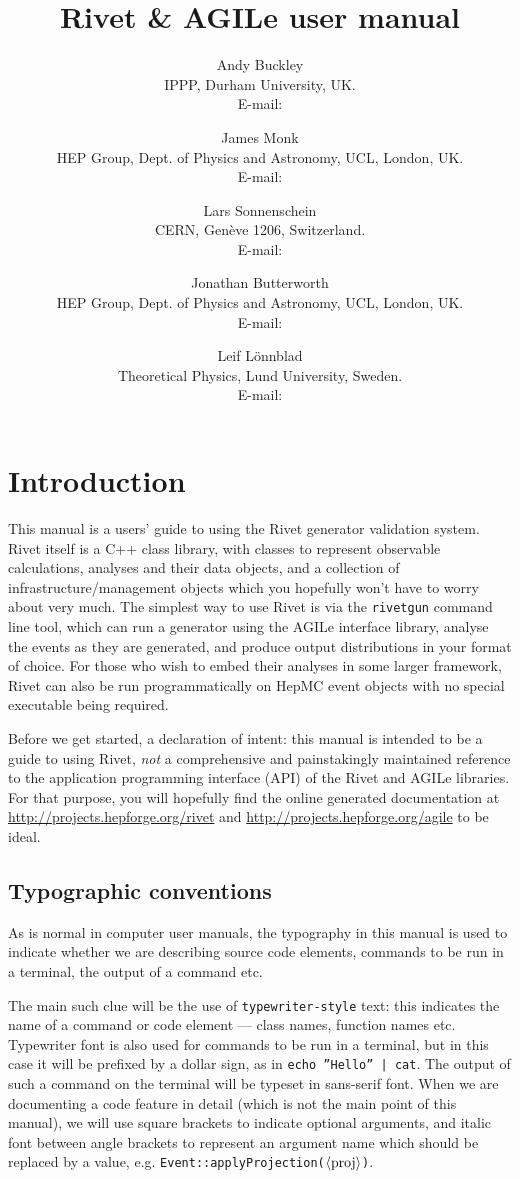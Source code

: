 \documentclass{JHEP3}
\title{Rivet \& AGILe user manual}
\author{Andy Buckley\\ IPPP, Durham University, UK.\\ E-mail: \email{andy.buckley@durham.ac.uk}}
\author{James Monk\\ HEP Group, Dept. of Physics and Astronomy, UCL, London, UK.\\ E-mail: \email{jmonk@hep.ucl.ac.uk}}
\author{Lars Sonnenschein\\ CERN, Gen\`eve 1206, Switzerland.\\ E-mail: \email{sonne@cern.ch}}
\author{Jonathan Butterworth\\ HEP Group, Dept. of Physics and Astronomy, UCL, London, UK.\\ E-mail: \email{J.Butterworth@ucl.ac.uk}}
\author{Leif L\"onnblad\\ Theoretical Physics, Lund University, Sweden.\\ E-mail: \email{lonnblad@thep.lu.se}}
\newcommand{\kbd}[1]{\texttt{#1}\xspace}
\newcommand{\inp}[1]{\textsf{\textdollar}\hspace{1mm}\texttt{#1}\xspace}
\newcommand{\outp}[1]{\textsf{#1}\xspace}
\newcommand{\code}[1]{\texttt{#1}\xspace}
\newcommand{\val}[1]{\textit{\ensuremath{\langle\text{\textrm{#1}\/}\rangle}}\xspace}
\begin{document}
 


\section{Introduction}
This manual is a users' guide to using the Rivet generator validation
system. Rivet itself is a C++ class library, with classes to represent
observable calculations, analyses and their data objects, and a collection of
infrastructure/management objects which you hopefully won't have to worry about
very much. The simplest way to use Rivet is via the \kbd{rivetgun} command line
tool, which can run a generator using the AGILe interface library, analyse the
events as they are generated, and produce output distributions in your format of
choice. For those who wish to embed their analyses in some larger framework,
Rivet can also be run programmatically on HepMC event objects with no special
executable being required.

Before we get started, a declaration of intent: this manual is intended to be a
guide to using Rivet, \emph{not} a comprehensive and painstakingly maintained
reference to the application programming interface (API) of the Rivet and AGILe
libraries. For that purpose, you will hopefully find the online generated
documentation at \url{http://projects.hepforge.org/rivet} and
\url{http://projects.hepforge.org/agile} to be ideal.

\subsection{Typographic conventions}
As is normal in computer user manuals, the typography in this manual is used to
indicate whether we are describing source code elements, commands to be run in a
terminal, the output of a command etc.

The main such clue will be the use of \kbd{typewriter-style} text: this
indicates the name of a command or code element --- class names, function names
etc. Typewriter font is also used for commands to be run in a terminal, but in
this case it will be prefixed by a dollar sign, as in \inp{echo ''Hello'' |
  cat}.  The output of such a command on the terminal will be typeset in
\outp{sans-serif} font. When we are documenting a code feature in detail (which
is not the main point of this manual), we will use square brackets to indicate
optional arguments, and italic font between angle brackets to represent an
argument name which should be replaced by a value,
e.g. \code{Event::applyProjection(\val{proj})}.
\end{document}
